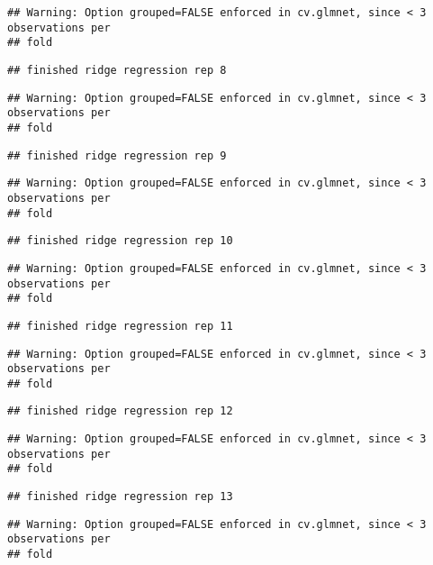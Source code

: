 \documentclass[]{article}
\begin{document}
\begin{verbatim}
## Warning: Option grouped=FALSE enforced in cv.glmnet, since < 3 observations per
## fold
\end{verbatim}

\begin{verbatim}
## finished ridge regression rep 8
\end{verbatim}

\begin{verbatim}
## Warning: Option grouped=FALSE enforced in cv.glmnet, since < 3 observations per
## fold
\end{verbatim}

\begin{verbatim}
## finished ridge regression rep 9
\end{verbatim}

\begin{verbatim}
## Warning: Option grouped=FALSE enforced in cv.glmnet, since < 3 observations per
## fold
\end{verbatim}

\begin{verbatim}
## finished ridge regression rep 10
\end{verbatim}

\begin{verbatim}
## Warning: Option grouped=FALSE enforced in cv.glmnet, since < 3 observations per
## fold
\end{verbatim}

\begin{verbatim}
## finished ridge regression rep 11
\end{verbatim}

\begin{verbatim}
## Warning: Option grouped=FALSE enforced in cv.glmnet, since < 3 observations per
## fold
\end{verbatim}

\begin{verbatim}
## finished ridge regression rep 12
\end{verbatim}

\begin{verbatim}
## Warning: Option grouped=FALSE enforced in cv.glmnet, since < 3 observations per
## fold
\end{verbatim}

\begin{verbatim}
## finished ridge regression rep 13
\end{verbatim}

\begin{verbatim}
## Warning: Option grouped=FALSE enforced in cv.glmnet, since < 3 observations per
## fold
\end{verbatim}
\end{document}
